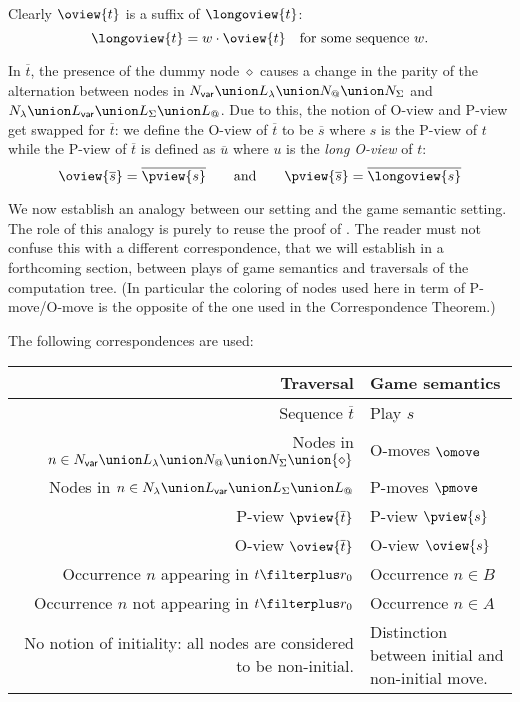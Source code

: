  Clearly  $\oview{t}$ is a suffix of
$\longoview{t}$:
\begin{equation}
  \longoview{t} = w \cdot \oview{t} \quad \mbox{for some sequence $w$.} \label{eqn:oview_suffix_longoview}
\end{equation}

In $\overline{t}$, the presence of the dummy node $\diamond$ causes
a change in the parity of the alternation between nodes in $N_{\sf
var} \union L_\lambda \union N_@ \union N_\Sigma$ and $N_\lambda
\union L_{\sf var} \union L_\Sigma \union L_@$. Due to this, the
notion of O-view and P-view get swapped for $\overline{t}$: we
define the O-view of $\overline{t}$ to be $\overline{s}$ where $s$
is the P-view of $t$ while the P-view of $\overline{t}$ is defined as
$\overline{u}$ where $u$ is the \emph{long O-view} of $t$:
\begin{equation}
\oview{\overline{s}} = \overline{\pview{s}} \qquad
\mbox{and}
\qquad  \pview{\overline{s}} =
\overline{\longoview{s}} \label{eqn:def_pview_oview_hat}
\end{equation}

We now establish an analogy between our setting and the game
semantic setting. The role of this analogy is purely to reuse the
proof of \cite{hylandong_pcf}. The reader must not confuse this with
a different correspondence, that we will establish in a forthcoming
section, between plays of game semantics and traversals of the
computation tree. (In particular the coloring of nodes used here in
term of P-move/O-move is the opposite of the one used in the
Correspondence Theorem.)

The following correspondences are used:
\begin{center}
\begin{tabular}{r|p{6cm}}
{\bf Traversal} & {\bf Game semantics} \\
\hline\hline
Sequence $\overline{t}$ & Play $s$ \\
Nodes in $n \in N_{\sf var} \union L_\lambda \union N_@ \union N_\Sigma \union \{\diamond\}$ & O-moves $\omove$ \\
Nodes in $n \in N_\lambda \union L_{\sf var} \union L_\Sigma \union L_@$ & P-moves $\pmove$\\
P-view $\pview{\overline{t}}$  & P-view $\pview{s}$\\
O-view $\oview{\overline{t}}$  & O-view $\oview{s}$\\
Occurrence $n$ appearing in $t\filterplus r_0$ & Occurrence $n \in B$ \\
Occurrence $n$ not appearing in $t\filterplus r_0$ & Occurrence $n \in A$ \\
\parbox[t]{6cm}{\raggedleft No notion of initiality: all nodes are considered to be non-initial.} & Distinction between initial and non-initial move.
\end{tabular}
\end{center}

